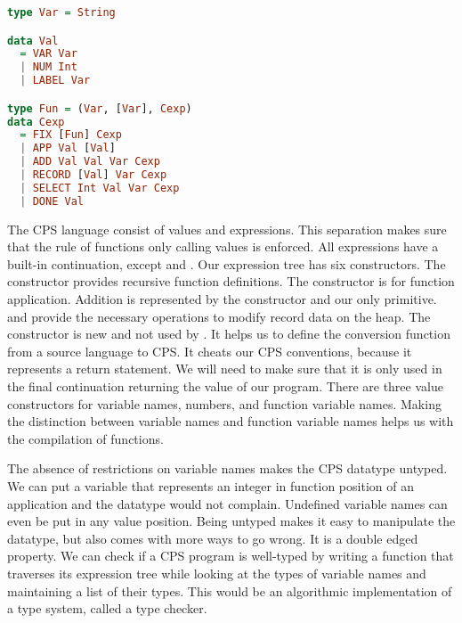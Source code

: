 \begin{lstlisting}[language=Haskell]
type Var = String

data Val
  = VAR Var
  | NUM Int
  | LABEL Var

type Fun = (Var, [Var], Cexp)
data Cexp
  = FIX [Fun] Cexp
  | APP Val [Val]
  | ADD Val Val Var Cexp
  | RECORD [Val] Var Cexp
  | SELECT Int Val Var Cexp
  | DONE Val
\end{lstlisting}

The \ac{CPS} language consist of values and expressions. This separation makes sure that the rule of functions only calling values is enforced. All expressions have a built-in continuation, except  and . Our expression tree has six constructors. The  constructor provides recursive function definitions. The  constructor is for function application. Addition is represented by the  constructor and our only primitive.  and  provide the necessary operations to modify record data on the heap. The  constructor is new and not used by \citeauthor{DBLP:books/daglib/0022396}. It helps us to define the conversion function from a source language to \ac{CPS}. It cheats our \ac{CPS} conventions, because it represents a return statement. We will need to make sure that it is only used in the final continuation returning the value of our program. There are three value constructors for variable names, numbers, and function variable names. Making the distinction between variable names and function variable names helps us with the compilation of functions. 

The absence of restrictions on variable names makes the \ac{CPS} datatype untyped. We can put a variable that represents an integer in function position of an application and the datatype would not complain. Undefined variable names can even be put in any value position. Being untyped makes it easy to manipulate the datatype, but also comes with more ways to go wrong. It is a double edged property. We can check if a \ac{CPS} program is well-typed by writing a function that traverses its expression tree while looking at the types of variable names and maintaining a list of their types. This would be an algorithmic implementation of a type system, called a type checker.

